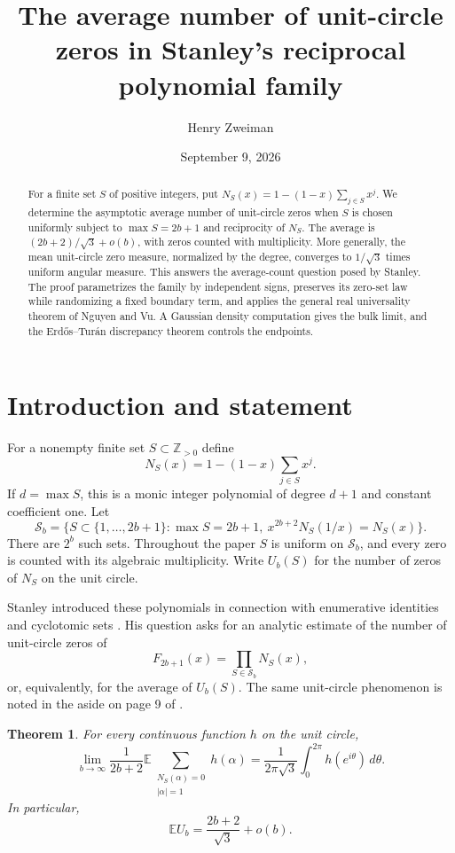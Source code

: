 \documentclass[11pt]{article}
\title{The average number of unit-circle zeros in Stanley's reciprocal polynomial family}
\author{Henry Zweiman}
\date{September 9, 2026}
\newtheorem{theorem}{Theorem}
\newcommand{\E}{\mathbb E}
\newcommand{\Z}{\mathbb Z}
\begin{document}
\maketitle
\begin{abstract}
For a finite set $S$ of positive integers, put
$N_S(x)=1-(1-x)\sum_{j\in S}x^j$.
We determine the asymptotic average number of unit-circle zeros when
$S$ is chosen uniformly subject to $\max S=2b+1$ and reciprocity of $N_S$.
The average is $(2b+2)/\sqrt3+o(b)$, with zeros counted with multiplicity.
More generally, the mean unit-circle zero measure, normalized by the degree,
converges to $1/\sqrt3$ times uniform angular measure.
This answers the average-count question posed by Stanley.
The proof parametrizes the family by independent signs, preserves its zero-set
law while randomizing a fixed boundary term, and applies the general real
universality theorem of Nguyen and Vu. A Gaussian density computation gives
the bulk limit, and the Erd\H{o}s--Tur\'an discrepancy theorem controls the endpoints.
\end{abstract}

\section{Introduction and statement}
For a nonempty finite set $S\subset\Z_{>0}$ define
\begin{equation}\label{eq:NS}
 N_S(x)=1-(1-x)\sum_{j\in S}x^j.
\end{equation}
If $d=\max S$, this is a monic integer polynomial of degree $d+1$ and
constant coefficient one. Let
\[
 \mathcal S_b=\{S\subset\{1,\ldots,2b+1\}:\max S=2b+1,
 \ x^{2b+2}N_S(1/x)=N_S(x)\}.
\]
There are $2^b$ such sets. Throughout the paper $S$ is uniform on
$\mathcal S_b$, and every zero is counted with its algebraic multiplicity.
Write $U_b(S)$ for the number of zeros of $N_S$ on the unit circle.

Stanley introduced these polynomials in connection with enumerative
identities and cyclotomic sets \cite{StanleyECA}. His question
\cite[Addendum 2]{StanleyMO} asks for an analytic estimate of the number of
unit-circle zeros of
\[
 F_{2b+1}(x)=\prod_{S\in\mathcal S_b}N_S(x),
\]
or, equivalently, for the average of $U_b(S)$.
The same unit-circle phenomenon is noted in the aside on page 9 of
\cite{StanleyECA}.

\begin{theorem}\label{thm:main}
For every continuous function $h$ on the unit circle,
\begin{equation}\label{eq:measure}
 \lim_{b\to\infty}\frac{1}{2b+2}
 \E\sum_{\substack{N_S(\alpha)=0\\|\alpha|=1}}h(\alpha)
 =\frac{1}{2\pi\sqrt3}\int_0^{2\pi}h(e^{i\theta})\,d\theta.
\end{equation}
In particular,
\begin{equation}\label{eq:mean}
 \E U_b=\frac{2b+2}{\sqrt3}+o(b).
\end{equation}
\end{theorem}
\end{document}
